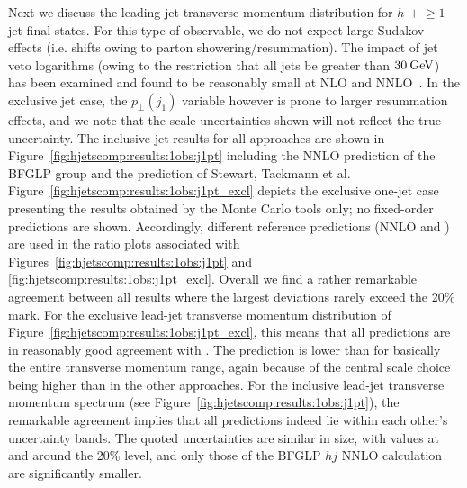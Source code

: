 Next we discuss the leading jet transverse momentum distribution for
$h\,+\!\ge\!\!1$-jet final states. For this type of observable, we do not
expect large Sudakov effects (i.e. shifts owing to parton
showering/resummation). The impact of jet veto logarithms (owing to
the restriction that all jets be greater than $30\text{\:GeV}$) has been
examined and found to be reasonably small at NLO and
NNLO~\cite{Banfi:2012jm,Banfi:2015pju}. 
In the exclusive jet case, the $p_\perp(j_1)$ variable however is
prone to larger resummation effects, and we note that the scale
uncertainties shown will not reflect the true uncertainty. The
inclusive jet results for all approaches are shown in
Figure~\ref{fig:hjetscomp:results:1obs:j1pt} including the NNLO
prediction of the BFGLP group and the prediction of Stewart, Tackmann
et al. Figure~\ref{fig:hjetscomp:results:1obs:j1pt_excl} depicts the
exclusive one-jet case presenting the results obtained by the Monte
Carlo tools only; no fixed-order predictions are shown. Accordingly,
different reference predictions (NNLO and \Powheg) are used in the
ratio plots associated with
Figures~\ref{fig:hjetscomp:results:1obs:j1pt} and
\ref{fig:hjetscomp:results:1obs:j1pt_excl}. 
Overall we find a rather remarkable agreement
between all results where the largest deviations rarely exceed the
20\% mark. For the exclusive lead-jet transverse momentum distribution
of Figure~\ref{fig:hjetscomp:results:1obs:j1pt_excl}, this means that
all predictions are in reasonably good agreement with \Powheg. The
\MGaMC prediction is lower than \Powheg for basically the entire
transverse momentum range, again because of the central scale choice
being higher than in the other approaches. For the inclusive lead-jet
transverse momentum spectrum (see
Figure~\ref{fig:hjetscomp:results:1obs:j1pt}), the remarkable
agreement implies that all predictions indeed lie within each other's
uncertainty bands. The quoted uncertainties are similar in size, with
values at and around the 20\% level, and only those of the BFGLP $hj$ NNLO
calculation are significantly smaller. 

